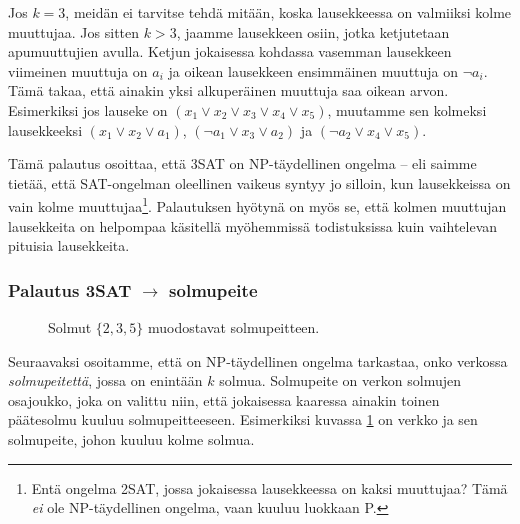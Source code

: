 Jos $k=3$, meidän ei tarvitse tehdä mitään, koska lausekkeessa
on valmiiksi kolme muuttujaa. Jos sitten $k>3$,
jaamme lausekkeen osiin, jotka ketjutetaan apumuuttujien avulla.
Ketjun jokaisessa kohdassa vasemman lausekkeen viimeinen
muuttuja on $a_i$ ja oikean lausekkeen ensimmäinen muuttuja on $\neg a_i$.
Tämä takaa, että ainakin yksi alkuperäinen muuttuja saa oikean arvon.
Esimerkiksi jos lauseke on $(x_1 \lor x_2 \lor x_3 \lor x_4 \lor x_5)$,
muutamme sen kolmeksi lausekkeeksi $(x_1 \lor x_2 \lor a_1)$,
$(\neg a_1 \lor x_3 \lor a_2)$ ja $(\neg a_2 \lor x_4 \lor x_5)$.

Tämä palautus osoittaa, että 3SAT on NP-täydellinen ongelma --
eli saimme tietää, että
SAT-ongelman oleellinen vaikeus syntyy jo silloin, kun lausekkeissa
on vain kolme muuttujaa\footnote{Entä ongelma 2SAT, jossa jokaisessa lausekkeessa
on kaksi muuttujaa? Tämä \emph{ei} ole NP-täydellinen ongelma,
vaan kuuluu luokkaan P.}.
Palautuksen hyötynä on myös se, että kolmen muuttujan lausekkeita
on helpompaa käsitellä myöhemmissä todistuksissa
kuin vaihtelevan pituisia lausekkeita.

\subsubsection{Palautus 3SAT $\rightarrow$ solmupeite}

\begin{figure}
\center
\begin{center}
\end{center}
\caption{Solmut $\{2,3,5\}$ muodostavat solmupeitteen.}
\label{fig:solpei}
\end{figure}

Seuraavaksi osoitamme, että on NP-täydellinen ongelma tarkastaa,
onko verkossa \emph{solmupeitettä}, jossa on enintään $k$ solmua.
Solmupeite on verkon solmujen osajoukko, joka on valittu niin,
että jokaisessa kaaressa ainakin toinen päätesolmu kuuluu
solmupeitteeseen.
Esimerkiksi kuvassa \ref{fig:solpei} on verkko ja sen solmupeite,
johon kuuluu kolme solmua.

